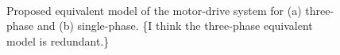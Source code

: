 \documentclass[journal,a4paper,10pt,twoside]{IEEEtran} %
\begin{document}
    \begin{figure}
	    \begin{center}
	                \\
	                \vspace{-3mm}
	    \end{center}
	    \vspace{-3mm}
	    \caption{Proposed equivalent model of the motor-drive system for (a) three-phase and (b) single-phase. {\color{red}\{I think the three-phase equivalent model is redundant.\}}}
	    \label{FIG7}
	\end{figure}
	
\end{document}
